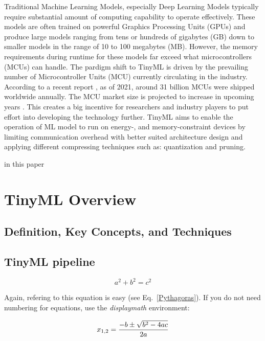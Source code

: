 \documentclass[twocolumn]{article}
\begin{document}
Traditional Machine Learning Models, especially Deep Learning Models typically require substantial amount of computing capability to operate effectively. These models are often trained on powerful Graphics Processing Units (GPUs) and produce large models ranging from tens or hundreds of gigabytes (GB) down to smaller models in the range of 10 to 100 megabytes (MB). However, the memory requirements during runtime for these models far exceed what microcontrollers (MCUs) can handle.
The pardigm shift to TinyML is driven by the prevailing number of Microcontroller Units (MCU) currently circulating in the industry. According to a recent report \cite{noauthor_microcontroller_nodate,grandviewresearch_microcontroller_2022}, as of 2021, around 31 billion MCUs were shipped worldwide annually. The MCU market size is projected to increase in upcoming years \cite{noauthor_microcontroller_nodate}. This creates a big incentive for researchers and industry players to put effort into developing the technology further.
TinyML aims to enable the operation of ML model to run on energy-, and memory-constraint devices by limiting communication overhead with better suited architecture design and applying different compressing techniques such as: quantization and pruning.

in this paper




\section{TinyML Overview}

\subsection{Definition, Key Concepts, and Techniques}

\subsection{TinyML pipeline}



\begin{equation}
a^2 + b^2 = c^2
\label{Pythagoras}
\end{equation}

Again, refering to this equation is easy (see Eq.~\ref{Pythagoras}).
If you do not need numbering for equations, use the {\em displaymath}
environment:

\begin{displaymath}
x_{1,2} = \frac{-b \pm \sqrt{b^2-4ac}}{2a}\\
\end{displaymath}
\end{document}
